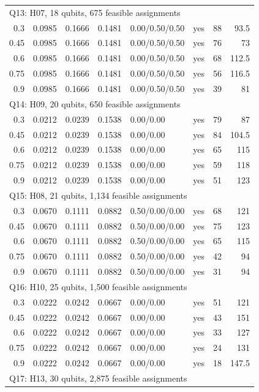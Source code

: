\begin{longtable}{rrrrlrrr}
\multicolumn{8}{l}{Q13: H07, 18 qubits, 675 feasible assignments} \\
0.3 & 0.0985 & 0.1666 & 0.1481 & 0.00/0.50/0.50 & yes & 88 & 93.5 \\
0.45 & 0.0985 & 0.1666 & 0.1481 & 0.00/0.50/0.50 & yes & 76 & 73 \\
0.6 & 0.0985 & 0.1666 & 0.1481 & 0.00/0.50/0.50 & yes & 68 & 112.5 \\
0.75 & 0.0985 & 0.1666 & 0.1481 & 0.00/0.50/0.50 & yes & 56 & 116.5 \\
0.9 & 0.0985 & 0.1666 & 0.1481 & 0.00/0.50/0.50 & yes & 39 & 81 \\
\multicolumn{8}{l}{Q14: H09, 20 qubits, 650 feasible assignments} \\
0.3 & 0.0212 & 0.0239 & 0.1538 & 0.00/0.00 & yes & 79 & 87 \\
0.45 & 0.0212 & 0.0239 & 0.1538 & 0.00/0.00 & yes & 84 & 104.5 \\
0.6 & 0.0212 & 0.0239 & 0.1538 & 0.00/0.00 & yes & 65 & 115 \\
0.75 & 0.0212 & 0.0239 & 0.1538 & 0.00/0.00 & yes & 59 & 118 \\
0.9 & 0.0212 & 0.0239 & 0.1538 & 0.00/0.00 & yes & 51 & 123 \\
\multicolumn{8}{l}{Q15: H08, 21 qubits, 1,134 feasible assignments} \\
0.3 & 0.0670 & 0.1111 & 0.0882 & 0.50/0.00/0.00 & yes & 68 & 121 \\
0.45 & 0.0670 & 0.1111 & 0.0882 & 0.50/0.00/0.00 & yes & 75 & 123 \\
0.6 & 0.0670 & 0.1111 & 0.0882 & 0.50/0.00/0.00 & yes & 65 & 115 \\
0.75 & 0.0670 & 0.1111 & 0.0882 & 0.50/0.00/0.00 & yes & 42 & 94 \\
0.9 & 0.0670 & 0.1111 & 0.0882 & 0.50/0.00/0.00 & yes & 31 & 94 \\
\multicolumn{8}{l}{Q16: H10, 25 qubits, 1,500 feasible assignments} \\
0.3 & 0.0222 & 0.0242 & 0.0667 & 0.00/0.00 & yes & 51 & 121 \\
0.45 & 0.0222 & 0.0242 & 0.0667 & 0.00/0.00 & yes & 43 & 151 \\
0.6 & 0.0222 & 0.0242 & 0.0667 & 0.00/0.00 & yes & 33 & 127 \\
0.75 & 0.0222 & 0.0242 & 0.0667 & 0.00/0.00 & yes & 24 & 131 \\
0.9 & 0.0222 & 0.0242 & 0.0667 & 0.00/0.00 & yes & 18 & 147.5 \\
\multicolumn{8}{l}{Q17: H13, 30 qubits, 2,875 feasible assignments} \\

\end{longtable}
